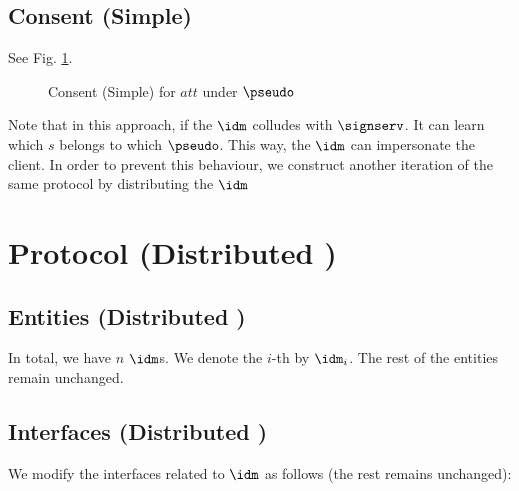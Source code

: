\subsection{Consent (Simple)}
 See Fig. \ref{prot:consent_simple}.
\begin{figure*}[h]
\caption{Consent (Simple) for $att$ under $\pseudo$}
\label{prot:consent_simple}
\end{figure*}

Note that in this approach, if the $\idm$ colludes with $\signserv$. It can learn which $s$ belongs to which $\pseudo$. This way, the $\idm$ can impersonate the client. In order to prevent this behaviour, we construct another iteration of the same protocol by distributing the $\idm$


\section{Protocol (Distributed \idm)}
\subsection{Entities  (Distributed \idm)}
In total, we have $n$ $\idm$s. We denote the $i$-th by $\idm_i$. The rest of the entities remain unchanged.
\subsection{Interfaces (Distributed \idm)}
We modify the interfaces related to $\idm$ as follows (the rest remains unchanged):

